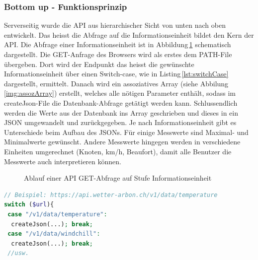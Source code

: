 \subsubsection{Bottom up - Funktionsprinzip}
Serverseitig wurde die API aus hierarchischer Sicht von unten nach oben entwickelt. Das heisst die Abfrage auf die Informationseinheit bildet den Kern der API. Die Abfrage einer Informationseinheit ist in Abbildung\,\ref{img:APIFiles} schematisch dargestellt. Die GET-Anfrage des Browsers wird als erstes dem PATH-File übergeben. Dort wird der Endpunkt das heisst die gewünschte Informationseinheit über einen Switch-case, wie in Listing\,\ref{lst:switchCase} dargestellt, ermittelt. Danach wird ein assoziatives Array (siehe Abbilung\,\ref{img:assozArray}) erstellt, welches alle nötigen Parameter enthält, sodass im createJson-File die Datenbank-Abfrage getätigt werden kann. Schlussendlich werden die Werte aus der Datenbank ins Array geschrieben und dieses in ein JSON umgewandelt und zurückgegeben. Je nach Informationseinheit gibt es Unterschiede beim Aufbau des JSONs. Für einige Messwerte sind Maximal- und Minimalwerte gewünscht. Andere Messwerte hingegen werden in verschiedene Einheiten umgerechnet (Knoten, km/h, Beaufort), damit alle Benutzer die Messwerte auch interpretieren können.

\begin{figure}[htbp!]
	\centering
	\caption{Ablauf einer API GET-Abfrage auf Stufe Informationseinheit}
	\label{img:APIFiles}
\end{figure}


\vspace{3mm}
\begin{lstlisting}[label=lst:switchCase,caption=Routing innerhalb einer Kategorie mittels Switch-case, language=php, style=php]
// Beispiel: https://api.wetter-arbon.ch/v1/data/temperature
switch ($url){
 case "/v1/data/temperature":
  createJson(...); break;
 case "/v1/data/windchill":
  createJson(...); break;
 //usw.
\end{lstlisting}
\vspace{3mm}



